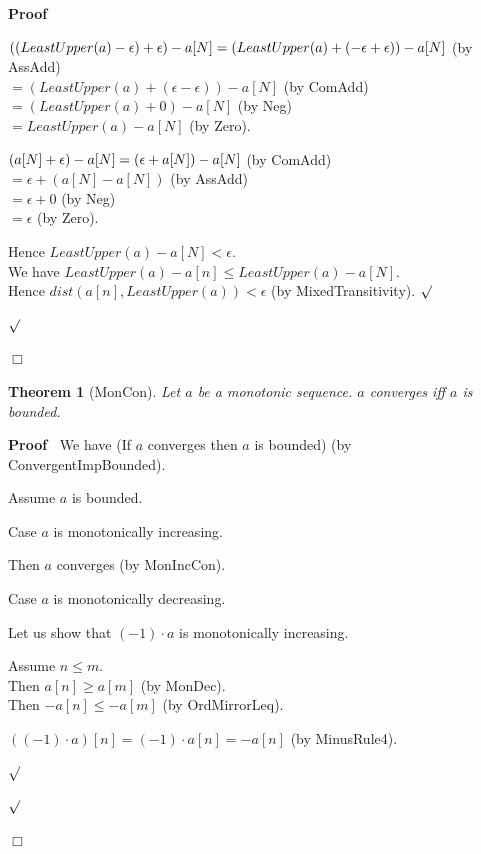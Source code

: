 \documentclass{article}
\newenvironment{forthel}{\begin{leftbar}}{\end{leftbar}}
\newenvironment{proof}{\noindent\textbf{Proof\ }}{\hspace*{\fill}$\Box$\medskip}
\newenvironment{subproof}{\begin{list}{}{}
		\item[\text{Proof}]}{\hfill $\surd$ \end{list}}
\newenvironment{case}{\begin{list}{}{}
		\item[]}{\end{list}}
\newtheorem{theorem}{Theorem}
\newcommand{\cdottwo}{\cdot}
\newcommand{\dotequal}{=}
\begin{document}
\begin{forthel}
\begin{proof}
\begin{subproof}
\begin{subproof}
				$((LeastUpper(a) - \epsilon) + \epsilon) - a[N]\\
				\dotequal (LeastUpper(a) + (-\epsilon + \epsilon)) - a[N]$ (by AssAdd)\\
				$\dotequal (LeastUpper(a) + (\epsilon - \epsilon)) - a[N]$ (by ComAdd)\\
				$\dotequal (LeastUpper(a) + 0) - a[N]$ (by Neg)\\
				$\dotequal LeastUpper(a) - a[N]$ (by Zero).
				
				$(a[N] + \epsilon) - a[N]\\ \dotequal (\epsilon + a[N]) - a[N]$ (by ComAdd)\\
				$\dotequal \epsilon + (a[N] - a[N])$ (by AssAdd)\\
				$\dotequal \epsilon + 0$ (by Neg)\\
				$\dotequal \epsilon$ (by Zero).
				
				Hence $LeastUpper(a) - a[N] < \epsilon$.\\
				We have $LeastUpper(a) - a[n] \leq LeastUpper(a) - a[N]$.\\
				Hence $dist(a[n],LeastUpper(a)) < \epsilon$ (by MixedTransitivity).
			\end{subproof}
		\end{subproof}
	\end{proof}
	
	\begin{theorem}[MonCon]
		Let $a$ be a monotonic sequence. $a$ converges iff $a$ is bounded.
	\end{theorem}
	
	\begin{proof}
		We have (If $a$ converges then $a$ is bounded) (by ConvergentImpBounded).
		
		\noindent Assume $a$ is bounded.
		
		\noindent Case $a$ is monotonically increasing.
		\begin{case}
			Then $a$ converges (by MonIncCon). 
		\end{case} 
		Case $a$ is monotonically decreasing.
		\begin{subproof}
			Let us show that $(-1) \cdottwo a$ is monotonically increasing.
			
			\begin{subproof}
				Assume $n \leq m$.\\
				Then $a[n] \geq a[m]$ (by MonDec).\\
				Then $-a[n] \leq -a[m]$ (by OrdMirrorLeq).
				
				$((-1) \cdottwo a)[n] \dotequal (-1) \cdot a[n]
				\dotequal -a[n]$ (by MinusRule4).
				

\end{subproof}
\end{subproof}
\end{proof}
\end{forthel}
\end{document}
